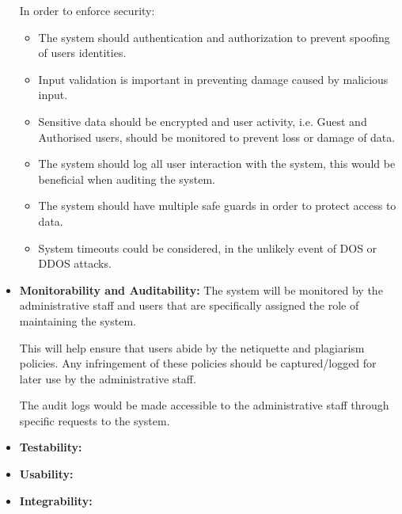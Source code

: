 \begin{flushleft}
\begin{itemize}
In order to enforce security:
\begin{itemize}
 \item The system should authentication and authorization to prevent spoofing of users identities.
 \item Input validation is important in preventing damage caused by malicious input.
 \item Sensitive data should be encrypted and user activity, i.e. Guest and Authorised users, should be monitored to prevent loss or damage of data.
 \item The system should log all user interaction with the system, this would be beneficial when auditing the system.
 \item The system should have multiple safe guards in order to protect access to data.
 \item System timeouts could be considered, in the unlikely event of DOS or DDOS attacks.
\end{itemize}
 
		\item \textbf{Monitorability and Auditability:} 
The system will be monitored by the administrative staff and users that are specifically assigned the role of maintaining the system. \newline

This will help ensure that users abide by the netiquette and plagiarism policies. Any infringement of these policies should be captured/logged for later use by the administrative staff. \newline

The audit logs would be made accessible to the administrative staff through specific requests to the system. 
			
		\item \textbf{Testability:} 
		\item \textbf{Usability:} 
		\item \textbf{Integrability:} 
	\end{itemize}
	
\end{flushleft}

